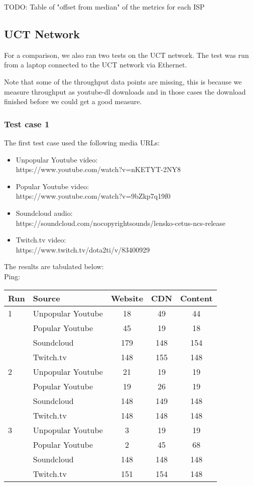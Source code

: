 \documentclass{sig-alternate-05-2015}
\begin{document}
TODO: Table of "offset from median" of the metrics for each ISP


\subsection{UCT Network}
For a comparison, we also ran two tests on the UCT network. The test was run from a laptop connected to the UCT network via Ethernet.

Note that some of the throughput data points are missing, this is because we measure throughput as youtube-dl downloads and in those cases the download finished before we could get a good measure.
\subsubsection{Test case 1}
The first test case used the following media URLs:
\begin{itemize}
	\item Unpopular Youtube video: \\ https://www.youtube.com/watch?v=nKETYT-2NY8
	\item Popular Youtube video: \\ https://www.youtube.com/watch?v=9bZkp7q19f0
	\item Soundcloud audio: \\ https://soundcloud.com/nocopyrightsounds/lensko-cetus-ncs-release
	\item Twitch.tv video: \\ https://www.twitch.tv/dota2ti/v/83400929
\end{itemize}
The results are tabulated below:
\vspace{1em} \\
Ping: \\
\begin{tabular}{|l|l|c|c|c|} \hline
Run & Source & Website & CDN & Content \\ \hline
1 & Unpopular Youtube & 18  & 49  & 44  \\ \hline
  & Popular Youtube   & 45  & 19  & 18  \\ \hline
  & Soundcloud        & 179 & 148 & 154 \\ \hline
  & Twitch.tv         & 148 & 155 & 148 \\ \hline
2 & Unpopular Youtube & 21  & 19  & 19  \\ \hline
  & Popular Youtube   & 19  & 26  & 19  \\ \hline
  & Soundcloud        & 148 & 149 & 148 \\ \hline
  & Twitch.tv         & 148 & 148 & 148 \\ \hline
3 & Unpopular Youtube & 3   & 19  & 19  \\ \hline
  & Popular Youtube   & 2   & 45  & 68  \\ \hline
  & Soundcloud        & 148 & 148 & 148 \\ \hline
  & Twitch.tv         & 151 & 154 & 148 \\ \hline
\end{tabular}
\end{document}
